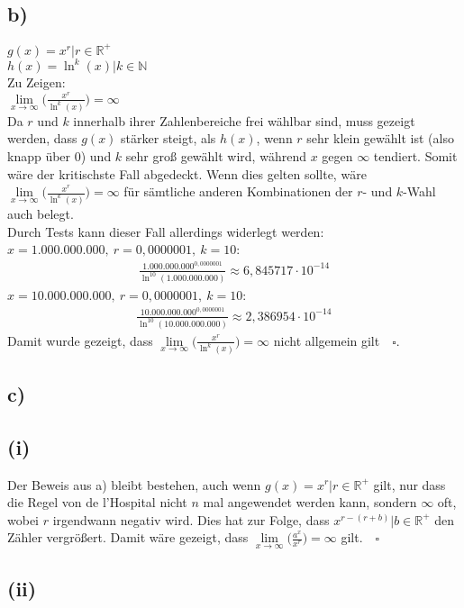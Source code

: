 \documentclass[a4paper]{scrartcl}
\newcommand{\qed}{\quad \square}
\begin{document}
\subsection{b)}
\(g(x)=x^r|r\in\mathbb{R^+}\)\\
\(h(x)=\ln ^k(x)|k\in\mathbb{N}\)\\
Zu Zeigen:\\
\(\lim\limits_{x\to\infty}\bigg(\frac{x^r}{\ln ^k(x)}\bigg)=\infty\)\\
Da \(r\) und \(k\) innerhalb ihrer Zahlenbereiche frei wählbar sind, muss gezeigt werden, dass \(g(x)\) stärker steigt, als \(h(x)\), wenn \(r\) sehr klein gewählt ist (also knapp über 0) und \(k\) sehr groß gewählt wird, während \(x\) gegen \(\infty\) tendiert. Somit wäre der kritischste Fall abgedeckt. Wenn dies gelten sollte, wäre \(\lim\limits_{x\to\infty}\bigg(\frac{x^r}{\ln ^k(x)}\bigg)=\infty\) für sämtliche anderen Kombinationen der \(r\)- und \(k\)-Wahl auch belegt.\\
Durch Tests kann dieser Fall allerdings widerlegt werden:\\
\(x=1.000.000.000,\ r=0,0000001,\ k=10\):
\begin{align}
\frac{1.000.000.000^{0,0000001}}{\ln ^{10}(1.000.000.000)}\approx 6,845717\cdot 10^{-14}
\end{align}
\(x=10.000.000.000,\ r=0,0000001,\ k=10\):
\begin{align}
\frac{10.000.000.000^{0,0000001}}{\ln ^{10}(10.000.000.000)}\approx 2,386954\cdot 10^{-14}
\end{align}
Damit wurde gezeigt, dass \(\lim\limits_{x\to\infty}\bigg(\frac{x^r}{\ln ^k(x)}\bigg)=\infty\) nicht allgemein gilt\(\qed\).
\subsection{c)}
\subsection{(i)}
Der Beweis aus a) bleibt bestehen, auch wenn \(g(x)=x^r|r\in\mathbb{R^+}\) gilt, nur dass die Regel von de l'Hospital nicht \(n\)  mal angewendet werden kann, sondern \(\infty\) oft, wobei \(r\) irgendwann negativ wird. Dies hat zur Folge, dass \(x^{r-(r+b)}|b\in\mathbb{R^+}\) den Zähler vergrößert.
Damit wäre gezeigt, dass \(\lim\limits_{x\to\infty}\bigg(\frac{a^x}{x^r}\bigg)=\infty\) gilt.\(\qed\) 
\subsection{(ii)}
\end{document}
